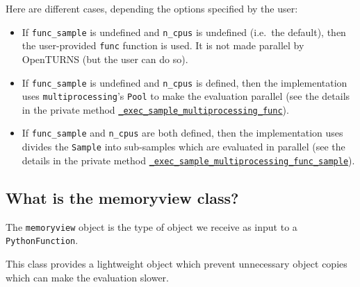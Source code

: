 \documentclass[11pt]{article}
\begin{document}
    Here are different cases, depending the options specified by the user:
    \begin{itemize}
\item If \texttt{func\_sample} is undefined and \texttt{n\_cpus} is undefined
(i.e.~the default), then the user-provided \texttt{func} function is
used. It is not made parallel by OpenTURNS (but the user can do so).

\item If \texttt{func\_sample} is undefined and \texttt{n\_cpus} is defined,
then the implementa\-tion uses \texttt{mul\-ti\-processing}'s \texttt{Pool} to
make the evaluation parallel (see the details in the private method
\href{https://github.com/openturns/openturns/blob/18146c0a82819c3f8d8e691a119a93c155429422/python/src/Function.i\#L213}{\texttt{\_exec\_sample\_multiprocessing\_func}}).

\item If \texttt{func\_sample} and \texttt{n\_cpus} are both defined, then
the implementation uses divides the \texttt{Sample} into sub-samples
which are evaluated in parallel (see the details in the private method 
\href{https://github.com/openturns/openturns/blob/18146c0a82819c3f8d8e691a119a93c155429422/python/src/Function.i\#L282}{\texttt{\_exec\_sample\_multiprocessing\_func\_sample}}).
\end{itemize}

    \hypertarget{what-is-the-memoryview-class}{%
\subsection{What is the memoryview
class?}\label{what-is-the-memoryview-class}}

The \texttt{memoryview} object is the type of object we receive as input
to a \texttt{PythonFunction}.

This class provides a lightweight object which prevent unnecessary
object copies which can make the evaluation slower.
\end{document}
